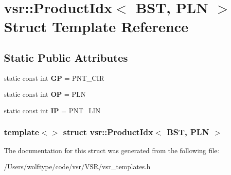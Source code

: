 \hypertarget{structvsr_1_1_product_idx_3_01_b_s_t_00_01_p_l_n_01_4}{\section{vsr\-:\-:Product\-Idx$<$ B\-S\-T, P\-L\-N $>$ Struct Template Reference}
\label{structvsr_1_1_product_idx_3_01_b_s_t_00_01_p_l_n_01_4}
}
\subsection*{Static Public Attributes}
\begin{DoxyCompactItemize}
\item 
\hypertarget{structvsr_1_1_product_idx_3_01_b_s_t_00_01_p_l_n_01_4_aa6eba6f7b8b98ab24e54e4c45b6f0cbc}{static const int {\bfseries G\-P} = P\-N\-T\-\_\-\-C\-I\-R}\label{structvsr_1_1_product_idx_3_01_b_s_t_00_01_p_l_n_01_4_aa6eba6f7b8b98ab24e54e4c45b6f0cbc}

\item 
\hypertarget{structvsr_1_1_product_idx_3_01_b_s_t_00_01_p_l_n_01_4_a72a377fede12af14cf4c566bac95e064}{static const int {\bfseries O\-P} = P\-L\-N}\label{structvsr_1_1_product_idx_3_01_b_s_t_00_01_p_l_n_01_4_a72a377fede12af14cf4c566bac95e064}

\item 
\hypertarget{structvsr_1_1_product_idx_3_01_b_s_t_00_01_p_l_n_01_4_a3089f84984a93f4ad3b4b2247b432721}{static const int {\bfseries I\-P} = P\-N\-T\-\_\-\-L\-I\-N}\label{structvsr_1_1_product_idx_3_01_b_s_t_00_01_p_l_n_01_4_a3089f84984a93f4ad3b4b2247b432721}

\end{DoxyCompactItemize}
\subsubsection*{template$<$$>$ struct vsr\-::\-Product\-Idx$<$ B\-S\-T, P\-L\-N $>$}



The documentation for this struct was generated from the following file\-:\begin{DoxyCompactItemize}
\item 
/\-Users/wolftype/code/vsr/\-V\-S\-R/vsr\-\_\-templates.\-h\end{DoxyCompactItemize}
